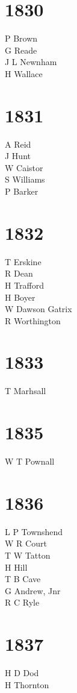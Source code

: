 \begin{multicols}{2}
  \section*{1830}
  P Brown \\
  G Reade \\
  J L Newnham \\
  H Wallace \\
  \section*{1831}
  A Reid \\
  J Hunt \\
  W Caistor \\
  S Williams \\
  P Barker \\
  \section*{1832}
  T Erskine \\
  R Dean \\
  H Trafford \\
  H Boyer \\
  W Dawson Gatrix \\
  R Worthington \\
  \section*{1833}
  T Marhsall \\
  \section*{1835}
  W T Pownall \\
  \section*{1836}
  L P Townshend \\
  W R Court \\
  T W Tatton \\
  H Hill \\
  T B Cave \\
  G Andrew, Jnr \\
  R C Ryle \\
  \section*{1837}
  H D Dod \\
  H Thornton \\

\end{multicols}
